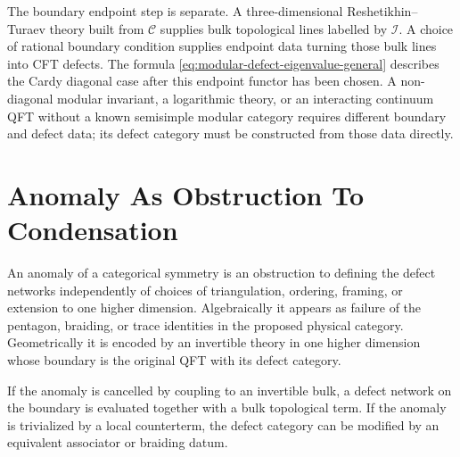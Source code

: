 The boundary endpoint step is separate.  A three-dimensional Reshetikhin--
Turaev theory built from \(\mathcal C\) supplies bulk topological lines
labelled by \(\mathcal I\).  A choice of rational boundary condition supplies
endpoint data turning those bulk lines into CFT defects.  The formula
\eqref{eq:modular-defect-eigenvalue-general} describes the Cardy diagonal
case after this endpoint functor has been chosen.  A non-diagonal modular
invariant, a logarithmic theory, or an interacting continuum QFT without a
known semisimple modular category requires different boundary and defect
data; its defect category must be constructed from those data directly.

\section{Anomaly As Obstruction To Condensation}

An anomaly of a categorical symmetry is an obstruction to defining the defect
networks independently of choices of triangulation, ordering, framing, or
extension to one higher dimension.  Algebraically it appears as failure of
the pentagon, braiding, or trace identities in the proposed physical
category.  Geometrically it is encoded by an invertible theory in one higher
dimension whose boundary is the original QFT with its defect category.

If the anomaly is cancelled by coupling to an invertible bulk, a defect
network on the boundary is evaluated together with a bulk topological term.
If the anomaly is trivialized by a local counterterm, the defect category can
be modified by an equivalent associator or braiding datum.

